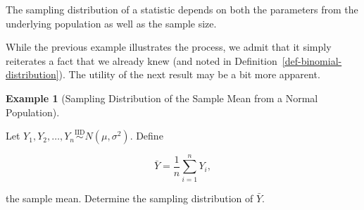 \documentclass[
  letterpaper,
  DIV=11,
  numbers=noendperiod]{scrreprt}
\theoremstyle{definition}
\theoremstyle{plain}
\theoremstyle{definition}
\newtheorem{example}{Example}[chapter]
\theoremstyle{remark}
\begin{document}
\begin{tcolorbox}[enhanced jigsaw, breakable, colframe=quarto-callout-tip-color-frame, titlerule=0mm, arc=.35mm, coltitle=black, opacitybacktitle=0.6, leftrule=.75mm, opacityback=0, left=2mm, toprule=.15mm, colbacktitle=quarto-callout-tip-color!10!white, title=\textcolor{quarto-callout-tip-color}{\faLightbulb}\hspace{0.5em}{Big Idea}, bottomtitle=1mm, toptitle=1mm, rightrule=.15mm, bottomrule=.15mm, colback=white]

The sampling distribution of a statistic depends on both the parameters
from the underlying population as well as the sample size.

\end{tcolorbox}

While the previous example illustrates the process, we admit that it
simply reiterates a fact that we already knew (and noted in
Definition~\ref{def-binomial-distribution}). The utility of the next
result may be a bit more apparent.

\begin{example}[Sampling Distribution of the Sample Mean from a Normal
Population]\protect\hypertarget{exm-normal-mean}{}\label{exm-normal-mean}

Let
\(Y_1, Y_2, \dotsc, Y_n \stackrel{\text{IID}}{\sim} N\left(\mu,\sigma^2\right)\).
Define

\[\bar{Y} = \frac{1}{n}\sum_{i=1}^{n} Y_i,\]

the sample mean. Determine the sampling distribution of \(\bar{Y}\).

\end{example}
\end{document}
